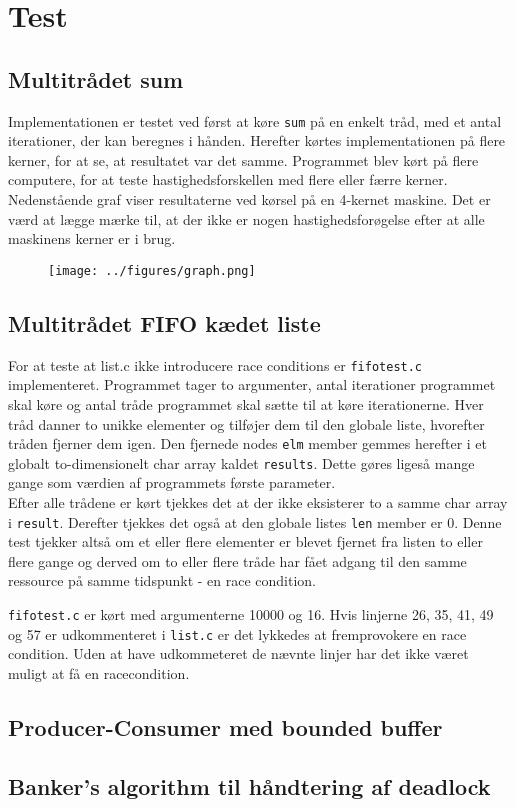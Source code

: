 \section{Test}

\subsection{Multitrådet sum}
Implementationen er testet ved først at køre \texttt{sum} på en enkelt tråd, med et antal iterationer, der kan beregnes i hånden.
Herefter kørtes implementationen på flere kerner, for at se, at resultatet var det samme. 
Programmet blev kørt på flere computere, for at teste hastighedsforskellen med flere eller færre kerner. 
Nedenstående graf viser resultaterne ved kørsel på en 4-kernet maskine. Det er værd at lægge mærke til, at der ikke er nogen hastighedsforøgelse efter at alle maskinens kerner er i brug. 

\begin{figure}[h!]
\center
\texttt{[image: ../figures/graph.png]}
\end{figure}

\subsection{Multitrådet FIFO kædet liste}
For at teste at list.c ikke introducere race conditions er \texttt{fifotest.c} implementeret. Programmet tager to argumenter, antal iterationer programmet skal køre og antal tråde programmet skal sætte til at køre iterationerne. Hver tråd danner to unikke elementer og tilføjer dem til den globale liste, hvorefter tråden fjerner dem igen. Den fjernede nodes \texttt{elm} member gemmes herefter i et globalt to-dimensionelt char array kaldet \texttt{results}. Dette gøres ligeså mange gange som værdien af programmets første parameter. \\

Efter alle trådene er kørt tjekkes det at der ikke eksisterer to a samme char array i \texttt{result}. Derefter tjekkes det også at den globale listes \texttt{len} member er 0. Denne test tjekker altså om et eller flere elementer er blevet fjernet fra listen to eller flere gange og derved om to eller flere tråde har fået adgang til den samme ressource på samme tidspunkt - en race condition.

\texttt{fifotest.c} er kørt med argumenterne 10000 og 16. Hvis linjerne 26, 35, 41, 49 og 57 er udkommenteret i \texttt{list.c} er det lykkedes at fremprovokere en race condition. Uden at have udkommeteret de nævnte linjer har det ikke været muligt at få en racecondition.

\subsection{Producer-Consumer med bounded buffer}

\subsection{Banker's algorithm til håndtering af deadlock}
